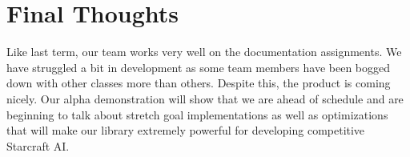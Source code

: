 \documentclass[10pt,letterpaper,onecolumn,draftclsnofoot]{IEEEtran}
\begin{document}
	\section{Final Thoughts}
	Like last term, our team works very well on the documentation assignments. We have struggled a bit in development as some team members have been bogged down with other classes more than others. Despite this, the product is coming nicely. Our alpha demonstration will show that we are ahead of schedule and are beginning to talk about stretch goal implementations as well as optimizations that will make our library extremely powerful for developing competitive Starcraft AI.
	
\end{document}
